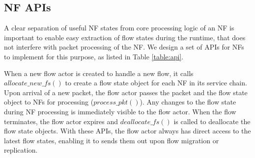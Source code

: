 \subsection{NF APIs}
\label{sec:NFAPIs}

A clear separation of useful NF states from core processing logic of an NF is important to enable easy extraction of flow states during the runtime, that does not interfere with packet processing of the NF. We design a set of APIs for NFs to implement for this purpose, as listed in Table \ref{table:api}.

\begin{table}[!t]
\centering
\caption{APIs for NFs in \nfactor}
\label{table:api}
\end{table}


When a new flow actor is created to handle a new flow, it calls $allocate\_new\_fs()$ to create a flow state object for each NF in its service chain. %
Upon arrival of a new packet, the flow actor passes the packet and the flow state object to NFs for processing ($process\_pkt()$). Any changes to the flow state during NF processing is immediately visible to the flow actor. When the flow terminates, the flow actor expires and $deallocate\_fs()$ is called to deallocate the flow state objects. With these APIs, the flow actor always has direct access to the latest flow states, enabling it to sends them out upon flow migration or replication. %

